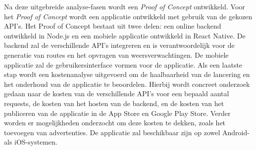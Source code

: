 Na deze uitgebreide analyse-fasen wordt een \emph{Proof of Concept} ontwikkeld.
Voor het \emph{Proof of Concept} wordt een applicatie ontwikkeld met gebruik van de gekozen API's.
Het Proof of Concept bestaat uit twee delen: een online backend ontwikkeld in Node.js
en een mobiele applicatie ontwikkeld in React Native. 
De backend zal de verschillende API's integreren en is verantwoordelijk voor 
de generatie van routes en het opvragen van weersverwachtingen.
De mobiele applicatie zal de gebruikersinterface vormen voor de applicatie.
Als een laatste stap wordt een kostenanalyse uitgevoerd om de haalbaarheid van de lancering en het onderhoud van de applicatie te beoordelen.
Hierbij wordt concreet onderzoek gedaan naar de kosten van de verschillende API's voor een bepaald aantal requests, 
de kosten van het hosten van de backend, en de kosten van het publiceren van de applicatie in de App Store en Google Play Store.
Verder worden er mogelijkheden onderzocht om deze kosten te dekken, zoals het toevoegen van advertenties.
De applicatie zal beschikbaar zijn op zowel Android- als iOS-systemen.

\lipsum[21-25]

